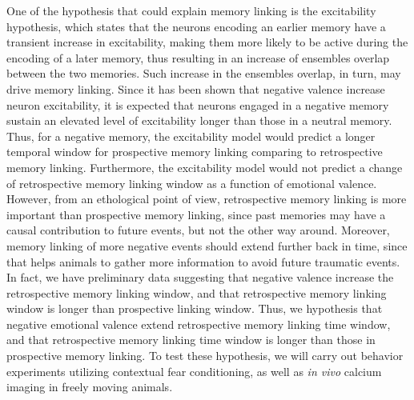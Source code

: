 \documentclass[master.tex]{subfiles}
\begin{document}
One of the hypothesis that could explain memory linking is the excitability
hypothesis, which states that the neurons encoding an earlier memory have a
transient increase in excitability, making them more likely to be active during
the encoding of a later memory, thus resulting in an increase of ensembles
overlap between the two memories. Such increase in the ensembles overlap, in
turn, may drive memory linking. Since it has been shown that negative valence
increase neuron excitability, it is expected that neurons engaged in a negative
memory sustain an elevated level of excitability longer than those in a neutral
memory. Thus, for a negative memory, the excitability model would predict a
longer temporal window for prospective memory linking comparing to retrospective
memory linking. Furthermore, the excitability model would not predict a change
of retrospective memory linking window as a function of emotional valence.
However, from an ethological point of view, retrospective memory linking is more
important than prospective memory linking, since past memories may have a causal
contribution to future events, but not the other way around. Moreover, memory
linking of more negative events should extend further back in time, since that
helps animals to gather more information to avoid future traumatic events. In
fact, we have preliminary data suggesting that negative valence increase the
retrospective memory linking window, and that retrospective memory linking
window is longer than prospective linking window. Thus, we hypothesis that
negative emotional valence extend retrospective memory linking time window, and
that retrospective memory linking time window is longer than those in
prospective memory linking. To test these hypothesis, we will carry out behavior
experiments utilizing contextual fear conditioning, as well as \textit{in vivo}
calcium imaging in freely moving animals.
\end{document}
